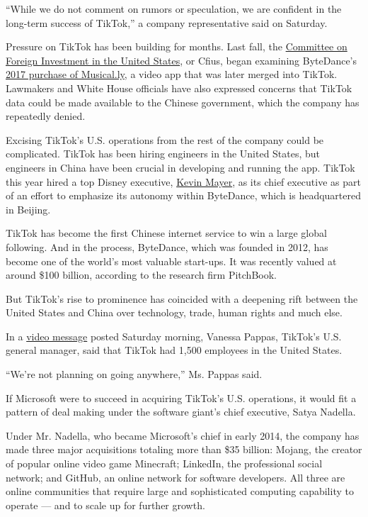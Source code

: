 ``While we do not comment on rumors or speculation, we are confident in
the long-term success of TikTok,'' a company representative said on
Saturday.

Pressure on TikTok has been building for months. Last fall, the
\href{https://www.nytimes3xbfgragh.onion/2019/11/01/technology/tiktok-national-security-review.html}{Committee
on Foreign Investment in the United States}, or Cfius, began examining
ByteDance's
\href{https://www.nytimes3xbfgragh.onion/2017/11/10/business/dealbook/musically-sold-app-video.html}{2017
purchase of Musical.ly}, a video app that was later merged into TikTok.
Lawmakers and White House officials have also expressed concerns that
TikTok data could be made available to the Chinese government, which the
company has repeatedly denied.

Excising TikTok's U.S. operations from the rest of the company could be
complicated. TikTok has been hiring engineers in the United States, but
engineers in China have been crucial in developing and running the app.
TikTok this year hired a top Disney executive,
\href{https://www.nytimes3xbfgragh.onion/2020/05/18/business/media/tiktok-ceo-kevin-mayer.html}{Kevin
Mayer}, as its chief executive as part of an effort to emphasize its
autonomy within ByteDance, which is headquartered in Beijing.

TikTok has become the first Chinese internet service to win a large
global following. And in the process, ByteDance, which was founded in
2012, has become one of the world's most valuable start-ups. It was
recently valued at around \$100 billion, according to the research firm
PitchBook.

But TikTok's rise to prominence has coincided with a deepening rift
between the United States and China over technology, trade, human rights
and much else.

In a
\href{https://twitter.com/tiktok_us/status/1289565422350553091}{video
message} posted Saturday morning, Vanessa Pappas, TikTok's U.S. general
manager, said that TikTok had 1,500 employees in the United States.

``We're not planning on going anywhere,'' Ms. Pappas said.

If Microsoft were to succeed in acquiring TikTok's U.S. operations, it
would fit a pattern of deal making under the software giant's chief
executive, Satya Nadella.

Under Mr. Nadella, who became Microsoft's chief in early 2014, the
company has made three major acquisitions totaling more than \$35
billion: Mojang, the creator of popular online video game Minecraft;
LinkedIn, the professional social network; and GitHub, an online network
for software developers. All three are online communities that require
large and sophisticated computing capability to operate --- and to scale
up for further growth.

